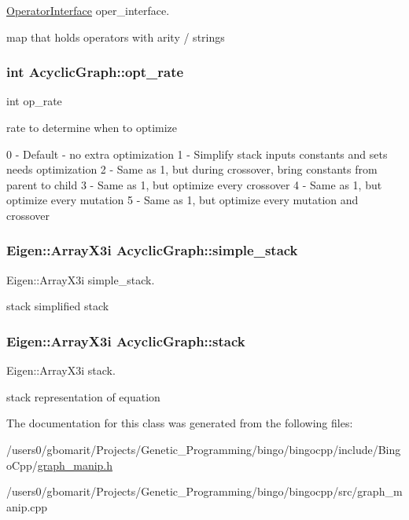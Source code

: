\hyperlink{classOperatorInterface}{Operator\+Interface} oper\+\_\+interface. 

map that holds operators with arity / strings 
\subsubsection[{\texorpdfstring{opt\+\_\+rate}{opt_rate}}]{\setlength{\rightskip}{0pt plus 5cm}int Acyclic\+Graph\+::opt\+\_\+rate}\hypertarget{classAcyclicGraph_a8d3ba0273e9b1084dc9b165e5f9231fb}{}\label{classAcyclicGraph_a8d3ba0273e9b1084dc9b165e5f9231fb}


int op\+\_\+rate 

rate to determine when to optimize

0 -\/ Default -\/ no extra optimization 1 -\/ Simplify stack inputs constants and sets needs optimization 2 -\/ Same as 1, but during crossover, bring constants from parent to child 3 -\/ Same as 1, but optimize every crossover 4 -\/ Same as 1, but optimize every mutation 5 -\/ Same as 1, but optimize every mutation and crossover 
\subsubsection[{\texorpdfstring{simple\+\_\+stack}{simple_stack}}]{\setlength{\rightskip}{0pt plus 5cm}Eigen\+::\+Array\+X3i Acyclic\+Graph\+::simple\+\_\+stack}\hypertarget{classAcyclicGraph_acea3997a10f2fe2acc6226f629413feb}{}\label{classAcyclicGraph_acea3997a10f2fe2acc6226f629413feb}


Eigen\+::\+Array\+X3i simple\+\_\+stack. 

stack simplified stack 
\subsubsection[{\texorpdfstring{stack}{stack}}]{\setlength{\rightskip}{0pt plus 5cm}Eigen\+::\+Array\+X3i Acyclic\+Graph\+::stack}\hypertarget{classAcyclicGraph_a0289993135a2d37ae5eaf5701801500f}{}\label{classAcyclicGraph_a0289993135a2d37ae5eaf5701801500f}


Eigen\+::\+Array\+X3i stack. 

stack representation of equation 

The documentation for this class was generated from the following files\+:\begin{DoxyCompactItemize}
\item 
/users0/gbomarit/\+Projects/\+Genetic\+\_\+\+Programming/bingo/bingocpp/include/\+Bingo\+Cpp/\hyperlink{graph__manip_8h}{graph\+\_\+manip.\+h}\item 
/users0/gbomarit/\+Projects/\+Genetic\+\_\+\+Programming/bingo/bingocpp/src/graph\+\_\+manip.\+cpp\end{DoxyCompactItemize}
